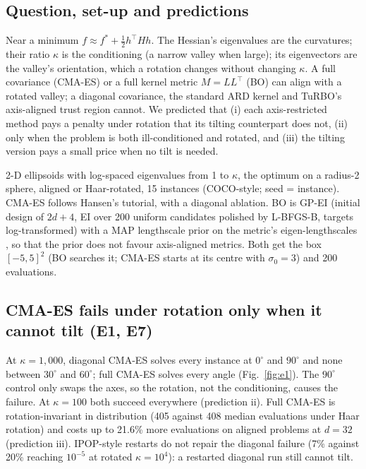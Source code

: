 \documentclass[10pt,a4paper]{article}
\begin{document}
\subsection{Question, set-up and predictions}
Near a minimum $f\approx f^*+\tfrac12h^\top Hh$. The Hessian's eigenvalues
are the curvatures; their ratio $\kappa$ is the conditioning (a narrow valley when large); its eigenvectors
are the valley's orientation, which a rotation changes without changing $\kappa$. A full covariance
(CMA-ES) or a full kernel metric $M=LL^\top$ (BO) can align with a rotated valley; a diagonal covariance,
the standard ARD kernel and TuRBO's axis-aligned trust region \citep{eriksson2019turbo} cannot. We predicted
that (i) each axis-restricted method pays a penalty under rotation that its tilting counterpart does not,
(ii) only when the problem is both ill-conditioned and rotated, and (iii) the tilting version pays a small
price when no tilt is needed.

2-D ellipsoids with log-spaced eigenvalues from 1 to $\kappa$, the optimum on a radius-2
sphere, aligned or Haar-rotated, 15 instances (COCO-style; seed = instance). CMA-ES follows Hansen's
tutorial, with a diagonal ablation. BO is GP-EI (initial design of $2d+4$, EI over 200 uniform candidates
polished by L-BFGS-B, targets log-transformed) with a MAP lengthscale prior on the metric's
eigen-lengthscales \citep{hvarfner2024vanilla}, so that the prior does not favour axis-aligned metrics. Both
get the box $[-5,5]^2$ (BO searches it; CMA-ES starts at its centre with $\sigma_0=3$) and 200 evaluations.

\subsection{CMA-ES fails under rotation only when it cannot tilt (E1, E7)}
At $\kappa=1{,}000$, diagonal CMA-ES solves every instance at $0^\circ$ and $90^\circ$ and none
between $30^\circ$ and $60^\circ$; full CMA-ES solves every angle (Fig.~\ref{fig:e1}). The $90^\circ$ control
only swaps the axes, so the rotation, not the conditioning, causes the failure. At $\kappa=100$ both succeed
everywhere (prediction ii). Full CMA-ES is rotation-invariant in distribution (405 against 408 median
evaluations under Haar rotation) and costs up to 21.6\% more evaluations on aligned problems at $d=32$
(prediction iii). IPOP-style restarts \citep{auger2005ipop} do not repair the diagonal failure (7\% against
20\% reaching $10^{-5}$ at rotated $\kappa=10^4$): a restarted diagonal run still cannot tilt.
\end{document}
